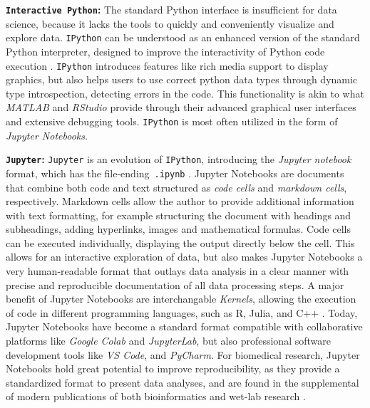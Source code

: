 \textbf{\texttt{\textbf Interactive Python}:} The standard Python interface is
insufficient for data science, because it lacks the tools to quickly and
conveniently visualize and explore data. \texttt{IPython} can be understood as
an enhanced version of the standard Python interpreter, designed to improve the
interactivity of Python code execution \cite{perezIPythonSystemInteractive2007}.
\texttt{IPython} introduces features like rich media support to display
graphics, but also helps users to use correct python data types through dynamic
type introspection, detecting errors in the code. This functionality is akin to
what \textit{MATLAB} and \textit{RStudio} provide through their advanced
graphical user interfaces and extensive debugging tools. \texttt{IPython} is most
often utilized in the form of \emph{Jupyter Notebooks}.



\textbf{\texttt{Jupyter}:} \texttt{Jupyter} is an evolution of \texttt{IPython},
introducing the \emph{Jupyter notebook} format, which has the
file-ending~\texttt{.ipynb} \cite{kluyverJupyterNotebooksPublishing2016}.
Jupyter Notebooks are documents that combine both code and text structured as
\emph{code cells} and \emph{markdown cells}, respectively. Markdown cells allow
the author to provide additional information with text formatting, for example
structuring the document with headings and subheadings, adding hyperlinks,
images and mathematical formulas. Code cells can be executed individually,
displaying the output directly below the cell. This allows for an interactive
exploration of data, but also makes Jupyter Notebooks a very human-readable
format that outlays data analysis in a clear manner with precise and
reproducible documentation of all data processing steps. A major benefit of
Jupyter Notebooks are interchangable \textit{Kernels}, allowing the execution of
code in different programming languages, such as R, Julia, and C++
\cite{giorgiLanguageEngineBioinformatics2022}. Today, Jupyter Notebooks have
become a standard format compatible with collaborative platforms like
\textit{Google Colab} and \textit{JupyterLab}, but also professional software
development tools like \textit{VS Code}, and \textit{PyCharm}. For biomedical
research, Jupyter Notebooks hold great potential to improve reproducibility, as
they provide a standardized format to present data analyses, and are found in
the supplemental of modern publications of both bioinformatics and wet-lab
research \cite{taskiranCelltypedirectedDesignSynthetic2024,
    bosch-queraltFluorescenceMicroscopybasedProtocol2022,
    howeChallengesOpportunitiesUnderstanding2015}.



